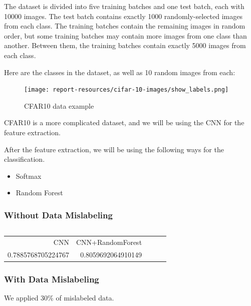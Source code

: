 \documentclass{article}
\begin{document}
The dataset is divided into five training batches and one test batch, each with 10000 images. The test batch contains exactly 1000 randomly-selected images from each class. The training batches contain the remaining images in random order, but some training batches may contain more images from one class than another. Between them, the training batches contain exactly 5000 images from each class.

Here are the classes in the dataset, as well as 10 random images from each:

\begin{figure}[H]
    \centering
    \texttt{[image: report-resources/cifar-10-images/show\_labels.png]}
    \caption{CFAR10 data example \cite{enwiki:1014793182}}
\end{figure}

CFAR10 is a more complicated dataset, and we will be using the CNN for the feature extraction. 

After the feature extraction, we will be using the following ways for the classification. 
\begin{itemize}
    \item Softmax
    \item Random Forest
\end{itemize}

\subsubsection{Without Data Mislabeling}

\inputminted[frame=single,framesep=10pt,fontsize=\footnotesize]{python}{cifar10/main.py}

\begin{table}[H]
    \centering
    \begin{tabular}{rrrrr}
        CNN &  CNN+RandomForest   \\
        0.7885768705224767 &       0.8059692064910149  \\
    \end{tabular}
\end{table}

\subsubsection{With Data Mislabeling}

We applied 30\% of mislabeled data. 

\inputminted[firstline=32,lastline=54,frame=single,framesep=10pt,fontsize=\footnotesize]{python}{cifar10-mislabeled/main.py}
\end{document}
